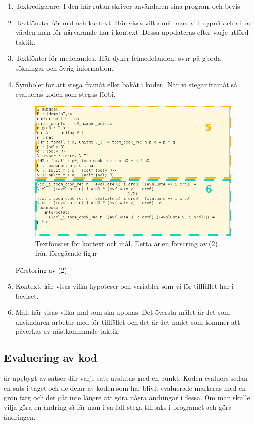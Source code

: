 \begin{enumerate}
\item Textredigerare. I den här rutan skriver användaren sina program och bevis
\item Textfönster för mål och kontext. Här visas vilka mål man vill uppnå och
  vilka värden man för närvarande har i kontext. Dessa uppdateras efter varje
  utförd taktik.
\item Textfönter för medelanden. Här dyker felmedelanden, svar på
  gjorda sökningar och övrig information.
\item Symboler för att stega framåt eller bakåt i koden. När vi stegar framåt
  så evalueras koden som stegas förbi.


\begin{figure}[h!]
  \centering
  \includegraphics[width=150mm]{images/Kontext}
  \caption[Fönster för kontext och mål]
   {Textfönster för kontext och mål. Detta är en försoring av (2) från
     föregående figur}
\end{figure}

Förstoring av (2)
\item Kontext, här visas vilka hypoteser och variabler som vi för tillfället
  har i beviset.
\item Mål, här visas vilka mål som ska uppnås. Det översta målet är det som
  användaren arbetar med för tillfället och det är det målet som kommer att
  påverkas av nästkommande taktik.
\end{enumerate}

\subsection{Evaluering av kod}
\coq är uppbygt av satser där varje sats avslutas med en punkt.
Koden evaluers sedan en sats i taget och de delar av koden som
har blivit evaluerade markeras med en grön färg och det går inte längre
att göra några ändringar i dessa. Om man skulle vilja göra en ändring så
får man i så fall stega tillbaks i programet och göra ändringen.

